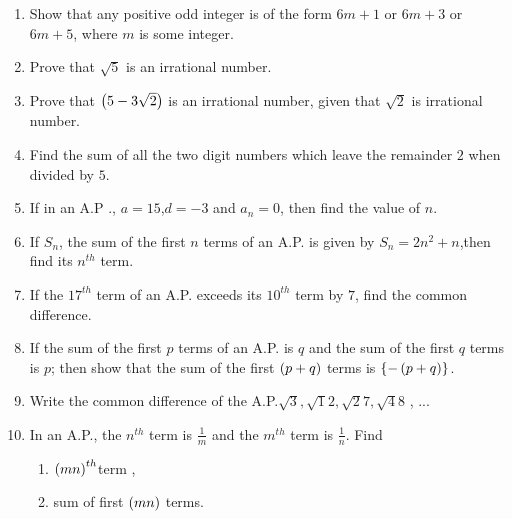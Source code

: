 \begin{enumerate}
\item Show that any positive odd integer is of the form $6m + 1$ or $6m + 3$ or $6m + 5$, where $m$ is some integer.

\item Prove that ${\sqrt 5}$ is an irrational number.

\item Prove that $\left(5 - 3{\sqrt 2}\right)$ is an irrational number, given that ${\sqrt2}$ is irrational number.

\item Find the sum of all the two digit numbers which leave the remainder $2$ when divided by $5$.

\item If in an A.P ., $a=15$,$d=-3$ and $a_n=0$, then find the value of $n$.

\item If ${S_n}$, the sum of the first ${n}$ terms of an A.P. is given by ${S_n = 2n^2 + n}$,then find its $n^{th}$ term. 

\item If the $17^{th}$ term of an A.P. exceeds its $10^{th}$ term by $7$, find the common difference.

\item If the sum of the first $p$ terms of an A.P. is $q$ and the sum of the first $q$ terms is $p$; then show that the sum of the first $\left(p + q\right)$ terms is $\left\{-\left(p + q\right)\right\}$.

\item Write the common difference of the A.P.${\sqrt3} , {\sqrt12} , {\sqrt27} , {\sqrt48}$ , ... 

\item In an A.P., the $n^{th}$ term is ${\frac{1}{m}}$ and the $m^{th}$ term is $\frac{1}{n}$. Find 
\begin{enumerate}
     \item  $\left(mn\right)^{th}$term  ,
     \item sum of first $\left(mn\right)$ terms.
\end{enumerate}


\end{enumerate}
